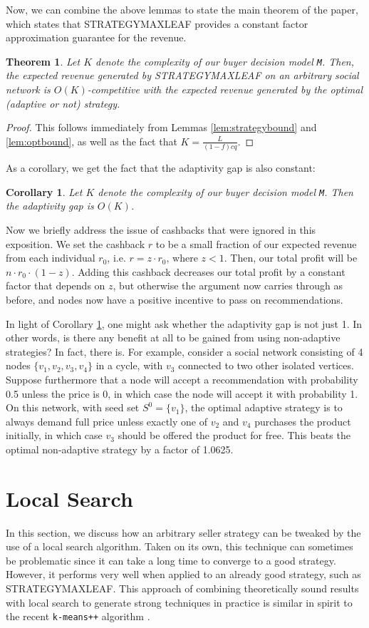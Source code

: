 \documentclass[letterpaper,twoside]{article}
\newtheorem{theorem}{Theorem}
\newtheorem{corollary}{Corollary}
\newcommand{\M}{\texttt{M}}
\newcommand{\strategyml}{\textrm{S{\scriptsize TRATEGY}\-M{\scriptsize AX}\-L{\scriptsize EAF}}}
\begin{document}
Now, we can combine the above lemmas to state the main theorem of
the paper, which states that \strategyml{} provides a constant factor
approximation guarantee for the revenue.
\begin{theorem} \label{thm:approx}
  Let $K$ denote the complexity of our buyer decision model \M.
  Then, the expected revenue generated by \strategyml{} on an
  arbitrary social network is $O(K)$-competitive with the expected
  revenue generated by the optimal (adaptive or not) strategy.
\end{theorem}
\begin{proof}
  This follows immediately from Lemmas \ref{lem:strategybound} and
  \ref{lem:optbound}, as well as the fact that $K =
  \frac{L}{(1-f)cq}$.
\end{proof}
As a corollary, we get the fact that the adaptivity gap is also constant:
\begin{corollary} \label{adaptGap}
  Let $K$ denote the complexity of our buyer decision model \M. Then
  the adaptivity gap is $O(K)$.
\end{corollary}

Now we briefly address the issue of cashbacks that were ignored in this
exposition. We set the cashback $r$ to be a small fraction of our expected revenue
from each individual $r_0$, i.e. $r=z\cdot r_0$, where $z < 1$. Then, our total profit
will be $n \cdot r_0 \cdot (1 - z)$. Adding this cashback decreases our total profit by a constant
factor that depends on $z$, but otherwise the argument now carries through as
before, and nodes now have a positive incentive to pass on recommendations.

In light of Corollary \ref{adaptGap}, one might ask whether the adaptivity gap
is not just 1. In other words, is there any benefit at all to be gained from using non-adaptive
strategies? In fact, there is. For example, consider a social network consisting of 4
nodes $\{v_1, v_2, v_3, v_4\}$ in a cycle, with $v_3$ connected to two other
isolated vertices. Suppose furthermore that a node will accept a recommendation with
probability 0.5 unless the price is 0, in which case the node will accept it
with probability 1. On this network, with seed set $S^0 = \{v_1\}$,
the optimal adaptive strategy is to always demand full price unless exactly one
of $v_2$ and $v_4$ purchases the product initially, in which case $v_3$ should be
offered the product for free. This beats the optimal non-adaptive strategy by a 
factor of 1.0625.

\section{Local Search} \label{sec:localsearch}
In this section, we discuss how an arbitrary seller strategy can be tweaked
by the use of a local search algorithm. Taken on its own, this technique can
sometimes be problematic since it can take a long time to converge to a good
strategy. However, it performs very well when applied to an already good
strategy, such as \strategyml. This approach of combining theoretically sound
results with local search to generate strong techniques in practice is similar
in spirit to the recent \texttt{k-means++} algorithm \cite{AV07}.
\end{document}
